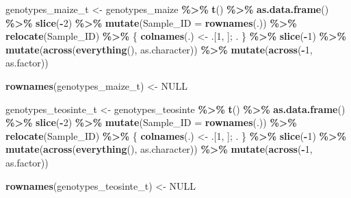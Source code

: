 \documentclass[
]{article}
\newenvironment{Shaded}{\begin{snugshade}}{\end{snugshade}}
\newcommand{\AttributeTok}[1]{\textcolor[rgb]{0.13,0.29,0.53}{#1}}
\newcommand{\ConstantTok}[1]{\textcolor[rgb]{0.56,0.35,0.01}{#1}}
\newcommand{\DecValTok}[1]{\textcolor[rgb]{0.00,0.00,0.81}{#1}}
\newcommand{\FunctionTok}[1]{\textcolor[rgb]{0.13,0.29,0.53}{\textbf{#1}}}
\newcommand{\NormalTok}[1]{#1}
\newcommand{\OtherTok}[1]{\textcolor[rgb]{0.56,0.35,0.01}{#1}}
\newcommand{\SpecialCharTok}[1]{\textcolor[rgb]{0.81,0.36,0.00}{\textbf{#1}}}
\begin{document}
\begin{Shaded}
\begin{Highlighting}[]
\NormalTok{genotypes\_maize\_t }\OtherTok{\textless{}{-}}\NormalTok{ genotypes\_maize }\SpecialCharTok{\%\textgreater{}\%}
  \FunctionTok{t}\NormalTok{() }\SpecialCharTok{\%\textgreater{}\%}
  \FunctionTok{as.data.frame}\NormalTok{() }\SpecialCharTok{\%\textgreater{}\%}
  \FunctionTok{slice}\NormalTok{(}\SpecialCharTok{{-}}\DecValTok{2}\NormalTok{) }\SpecialCharTok{\%\textgreater{}\%}
  \FunctionTok{mutate}\NormalTok{(}\AttributeTok{Sample\_ID =} \FunctionTok{rownames}\NormalTok{(.)) }\SpecialCharTok{\%\textgreater{}\%}
  \FunctionTok{relocate}\NormalTok{(Sample\_ID) }\SpecialCharTok{\%\textgreater{}\%}
\NormalTok{  \{ }\FunctionTok{colnames}\NormalTok{(.) }\OtherTok{\textless{}{-}}\NormalTok{ .[}\DecValTok{1}\NormalTok{, ]; . \} }\SpecialCharTok{\%\textgreater{}\%}
  \FunctionTok{slice}\NormalTok{(}\SpecialCharTok{{-}}\DecValTok{1}\NormalTok{) }\SpecialCharTok{\%\textgreater{}\%}
  \FunctionTok{mutate}\NormalTok{(}\FunctionTok{across}\NormalTok{(}\FunctionTok{everything}\NormalTok{(), as.character)) }\SpecialCharTok{\%\textgreater{}\%}
  \FunctionTok{mutate}\NormalTok{(}\FunctionTok{across}\NormalTok{(}\SpecialCharTok{{-}}\DecValTok{1}\NormalTok{, as.factor))}

\FunctionTok{rownames}\NormalTok{(genotypes\_maize\_t) }\OtherTok{\textless{}{-}} \ConstantTok{NULL}

\NormalTok{genotypes\_teosinte\_t }\OtherTok{\textless{}{-}}\NormalTok{ genotypes\_teosinte }\SpecialCharTok{\%\textgreater{}\%}
  \FunctionTok{t}\NormalTok{() }\SpecialCharTok{\%\textgreater{}\%}
  \FunctionTok{as.data.frame}\NormalTok{() }\SpecialCharTok{\%\textgreater{}\%}
  \FunctionTok{slice}\NormalTok{(}\SpecialCharTok{{-}}\DecValTok{2}\NormalTok{) }\SpecialCharTok{\%\textgreater{}\%}
  \FunctionTok{mutate}\NormalTok{(}\AttributeTok{Sample\_ID =} \FunctionTok{rownames}\NormalTok{(.)) }\SpecialCharTok{\%\textgreater{}\%}
  \FunctionTok{relocate}\NormalTok{(Sample\_ID) }\SpecialCharTok{\%\textgreater{}\%}
\NormalTok{  \{ }\FunctionTok{colnames}\NormalTok{(.) }\OtherTok{\textless{}{-}}\NormalTok{ .[}\DecValTok{1}\NormalTok{, ]; . \} }\SpecialCharTok{\%\textgreater{}\%}
  \FunctionTok{slice}\NormalTok{(}\SpecialCharTok{{-}}\DecValTok{1}\NormalTok{) }\SpecialCharTok{\%\textgreater{}\%}
  \FunctionTok{mutate}\NormalTok{(}\FunctionTok{across}\NormalTok{(}\FunctionTok{everything}\NormalTok{(), as.character)) }\SpecialCharTok{\%\textgreater{}\%}
  \FunctionTok{mutate}\NormalTok{(}\FunctionTok{across}\NormalTok{(}\SpecialCharTok{{-}}\DecValTok{1}\NormalTok{, as.factor))}

\FunctionTok{rownames}\NormalTok{(genotypes\_teosinte\_t) }\OtherTok{\textless{}{-}} \ConstantTok{NULL}
\end{Highlighting}
\end{Shaded}
\end{document}
